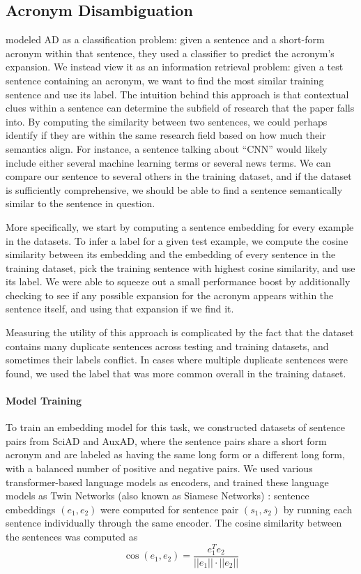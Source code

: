 \documentclass[letterpaper]{article} %
\begin{document}
\subsection{Acronym Disambiguation}
\citeauthor{veyseh-et-al-2020-what} modeled AD as a classification problem: given a sentence and a short-form acronym within that sentence, they used a classifier to predict the acronym's expansion. We instead view it as an information retrieval problem: given a test sentence containing an acronym, we want to find the most similar training sentence and use its label. The intuition behind this approach is that contextual clues within a sentence can determine the subfield of research that the paper falls into. By computing the similarity between two sentences, we could perhaps identify if they are within the same research field based on how much their semantics align. For instance, a sentence talking about ``CNN'' would likely include either several machine learning terms or several news terms. We can compare our sentence to several others in the training dataset, and if the dataset is sufficiently comprehensive, we should be able to find a sentence semantically similar to the sentence in question.

More specifically, we start by computing a sentence embedding for every example in the datasets. To infer a label for a given test example, we compute the cosine similarity between its embedding and the embedding of every sentence in the training dataset, pick the training sentence with highest cosine similarity, and use its label. We were able to squeeze out a small performance boost by additionally checking to see if any possible expansion for the acronym appears within the sentence itself, and using that expansion if we find it.

Measuring the utility of this approach is complicated by the fact that the dataset contains many duplicate sentences across testing and training datasets, and sometimes their labels conflict. In cases where multiple duplicate sentences were found, we used the label that was more common overall in the training dataset.

\paragraph*{Model Training}
To train an embedding model for this task, we constructed datasets of sentence pairs from SciAD and AuxAD, where the sentence pairs share a short form acronym and are labeled as having the same long form or a different long form, with a balanced number of positive and negative pairs. We used various transformer-based language models as encoders, and trained these language models as Twin Networks (also known as Siamese Networks) \cite{Chicco2021}: sentence embeddings $(e_1, e_2)$ were computed for sentence pair $(s_1, s_2)$ by running each sentence individually through the same encoder. The cosine similarity between the sentences was computed as
\[
\cos(e_1, e_2) = \frac{e_1^T e_2}{||e_1|| \cdot ||e_2||}
\]
\end{document}
